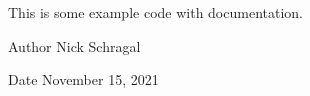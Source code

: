 This is some example code with documentation.

\begin{DoxyAuthor}{Author}
Nick Schragal 
\end{DoxyAuthor}
\begin{DoxyDate}{Date}
November 15, 2021 
\end{DoxyDate}
